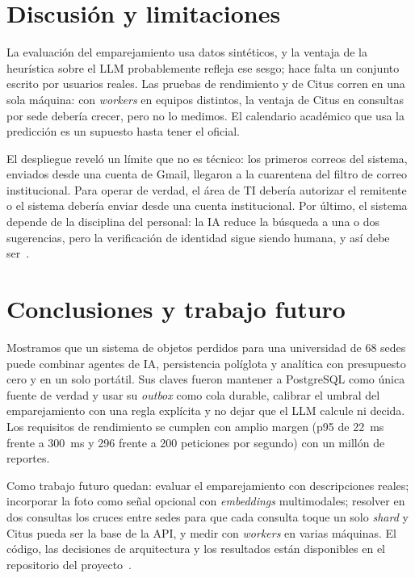 \documentclass[conference]{IEEEtran}
\begin{document}
\section{Discusión y limitaciones}

La evaluación del emparejamiento usa datos sintéticos, y la ventaja de la heurística sobre el LLM probablemente refleja ese sesgo; hace falta un conjunto escrito por usuarios reales. Las pruebas de rendimiento y de Citus corren en una sola máquina: con \emph{workers} en equipos distintos, la ventaja de Citus en consultas por sede debería crecer, pero no lo medimos. El calendario académico que usa la predicción es un supuesto hasta tener el oficial.

El despliegue reveló un límite que no es técnico: los primeros correos del sistema, enviados desde una cuenta de Gmail, llegaron a la cuarentena del filtro de correo institucional. Para operar de verdad, el área de TI debería autorizar el remitente o el sistema debería enviar desde una cuenta institucional. Por último, el sistema depende de la disciplina del personal: la IA reduce la búsqueda a una o dos sugerencias, pero la verificación de identidad sigue siendo humana, y así debe ser~\cite{amershi2019}.

\section{Conclusiones y trabajo futuro}

Mostramos que un sistema de objetos perdidos para una universidad de 68 sedes puede combinar agentes de IA, persistencia políglota y analítica con presupuesto cero y en un solo portátil. Sus claves fueron mantener a PostgreSQL como única fuente de verdad y usar su \emph{outbox} como cola durable, calibrar el umbral del emparejamiento con una regla explícita y no dejar que el LLM calcule ni decida. Los requisitos de rendimiento se cumplen con amplio margen (p95 de 22~ms frente a 300~ms y 296 frente a 200 peticiones por segundo) con un millón de reportes.

Como trabajo futuro quedan: evaluar el emparejamiento con descripciones reales; incorporar la foto como señal opcional con \emph{embeddings} multimodales; resolver en dos consultas los cruces entre sedes para que cada consulta toque un solo \emph{shard} y Citus pueda ser la base de la API, y medir con \emph{workers} en varias máquinas. El código, las decisiones de arquitectura y los resultados están disponibles en el repositorio del proyecto~\cite{repo2026}.



\end{document}
